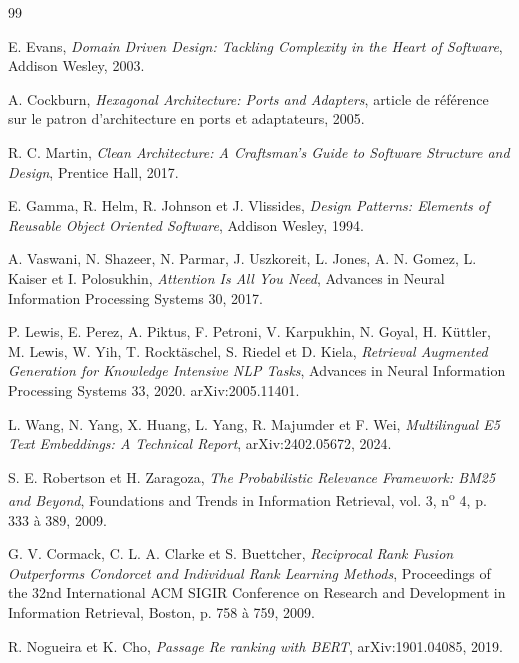 
\begin{thebibliography}{99}

E. Evans, \textit{Domain Driven Design: Tackling Complexity in the Heart of Software},
Addison Wesley, 2003.

A. Cockburn, \textit{Hexagonal Architecture: Ports and Adapters},
article de référence sur le patron d'architecture en ports et adaptateurs, 2005.

R. C. Martin, \textit{Clean Architecture: A Craftsman's Guide to Software Structure and Design},
Prentice Hall, 2017.

E. Gamma, R. Helm, R. Johnson et J. Vlissides,
\textit{Design Patterns: Elements of Reusable Object Oriented Software},
Addison Wesley, 1994.

A. Vaswani, N. Shazeer, N. Parmar, J. Uszkoreit, L. Jones, A. N. Gomez, L. Kaiser et I. Polosukhin,
\textit{Attention Is All You Need},
Advances in Neural Information Processing Systems 30, 2017.

P. Lewis, E. Perez, A. Piktus, F. Petroni, V. Karpukhin, N. Goyal, H. Küttler, M. Lewis,
W. Yih, T. Rocktäschel, S. Riedel et D. Kiela,
\textit{Retrieval Augmented Generation for Knowledge Intensive NLP Tasks},
Advances in Neural Information Processing Systems 33, 2020. arXiv:2005.11401.

L. Wang, N. Yang, X. Huang, L. Yang, R. Majumder et F. Wei,
\textit{Multilingual E5 Text Embeddings: A Technical Report},
arXiv:2402.05672, 2024.

S. E. Robertson et H. Zaragoza,
\textit{The Probabilistic Relevance Framework: BM25 and Beyond},
Foundations and Trends in Information Retrieval, vol. 3, n\textsuperscript{o} 4, p. 333 à 389, 2009.

G. V. Cormack, C. L. A. Clarke et S. Buettcher,
\textit{Reciprocal Rank Fusion Outperforms Condorcet and Individual Rank Learning Methods},
Proceedings of the 32nd International ACM SIGIR Conference on Research and Development in
Information Retrieval, Boston, p. 758 à 759, 2009.

R. Nogueira et K. Cho,
\textit{Passage Re ranking with BERT},
arXiv:1901.04085, 2019.


\end{thebibliography}

